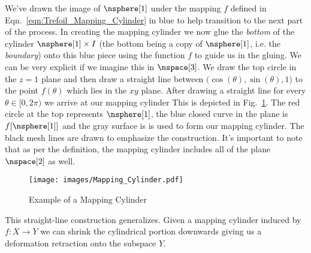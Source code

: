 \documentclass[oneside]{book}                                                  %
\begin{document}
                We've drawn the image of $\nsphere[1]$ under the mapping $f$
                defined in Eqn.~\ref{eqn:Trefoil_Mapping_Cylinder} in blue to
                help transition to the next part of the process. In creating the
                mapping cylinder we now glue the \textit{bottom} of the cylinder
                $\nsphere[1]\times{I}$ (the bottom being a copy of
                $\nsphere[1]$, i.e. the \textit{boundary}) onto this blue piece
                using the function $f$ to guide us in the gluing. We can be very
                explicit if we imagine this in $\nspace[3]$. We draw the top
                circle in the $z=1$ plane and then draw a straight line between
                $\big(\cos(\theta),\sin(\theta),1\big)$ to the point $f(\theta)$
                which lies in the $xy$ plane. After drawing a straight line for
                every $\theta\in[0,2\pi)$ we arrive at our mapping cylinder
                This is depicted in Fig.~\ref{fig:Ex_Mapping_Cylinder}. The red
                circle at the top represents $\nsphere[1]$, the blue closed
                curve in the plane is $f[\nsphere[1]]$ and the gray surface is
                is used to form our mapping cylinder. The black mesh lines are
                drawn to emphasize the construction. It's important to note that
                as per the definition, the mapping cylinder includes all of the
                plane $\nspace[2]$ as well.
                \begin{figure}[H]
                    \centering
                    \captionsetup{type=figure}
                    \texttt{[image: images/Mapping\_Cylinder.pdf]}
                    \caption{Example of a Mapping Cylinder}
                    \label{fig:Ex_Mapping_Cylinder}
                \end{figure}
                This straight-line construction generalizes. Given a mapping
                cylinder induced by $f:X\rightarrow{Y}$ we can shrink the
                cylindrical portion downwards giving us a deformation retraction
                onto the subspace $Y$.
\end{document}
